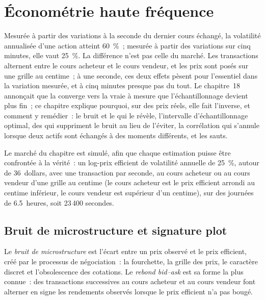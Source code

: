 \chapter{Économétrie haute fréquence}\label{ch:qm:high-frequency-econometrics}

Mesurée à partir des variations à la seconde du dernier cours échangé, la volatilité annualisée d'une action atteint 60~\%~; mesurée à partir des variations sur cinq minutes, elle vaut 25~\%. La
différence n'est pas celle du marché. Les transactions alternent entre le cours acheteur et le cours vendeur, et les prix sont posés sur une grille au centime~; à une seconde, ces deux
effets pèsent pour l'essentiel dans la variation mesurée, et à cinq minutes presque pas du tout. Le chapitre~18 annonçait que la  converge vers la  vraie à mesure que
l'échantillonnage devient plus fin~; ce chapitre explique pourquoi, sur des prix réels, elle fait l'inverse, et comment y remédier~: le bruit
et le  qui le révèle, l'intervalle d'échantillonnage optimal, des  qui suppriment le bruit au lieu de l'éviter, la corrélation qui
s'annule lorsque deux actifs sont échangés à des moments différents, et les sauts.

Le marché du chapitre est simulé, afin que chaque estimation puisse être confrontée à la vérité~: un log-prix efficient de volatilité annuelle de 25~\%, autour de
36~dollars, avec une transaction par seconde, au cours acheteur ou au cours vendeur d'une grille au centime (le cours acheteur est le prix efficient arrondi au centime inférieur, le cours vendeur
est supérieur d'un centime), sur des journées de 6.5~heures, soit 23\,400 secondes.

\section{Bruit de microstructure et signature plot}

\begin{definition}\label{def:qm:high-frequency-econometrics:noise}
Le \emph{bruit de microstructure} est l'écart entre un prix observé et le prix efficient, créé par le processus de négociation~: la
fourchette, la grille des prix, le caractère discret et l'obsolescence des cotations. Le \emph{rebond bid--ask} est sa forme la plus connue~: des transactions successives
au cours acheteur et au cours vendeur font alterner en signe les rendements observés lorsque le prix efficient n'a pas bougé.
\end{definition}

